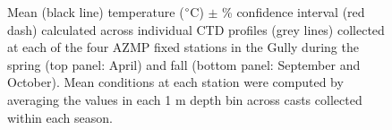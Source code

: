 \documentclass[12pt]{article}\usepackage[]{graphicx}\usepackage[]{color}
\begin{document}
\begin{landscapepage}
\begin{figure}[htb]

{\centering {} 

}

\caption{Mean (black line) temperature (\(\degree\)C) \thickspace \(\pm\) \% confidence interval (red dash) calculated across individual CTD profiles (grey lines) collected at each of the four AZMP fixed stations in the Gully during the spring (top panel: April) and fall (bottom panel: September and October). Mean conditions at each station were computed by averaging the values in each 1 m depth bin across casts collected within each season.}\label{fig:figure5}
\end{figure}
\end{landscapepage}
\clearpage
\end{document}
